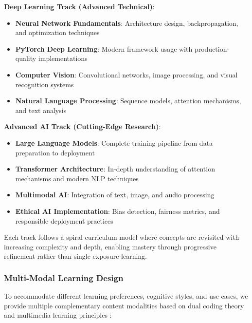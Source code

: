 \textbf{Deep Learning Track (Advanced Technical)}:
\begin{itemize}
    \item \textbf{Neural Network Fundamentals}: Architecture design, backpropagation, and optimization techniques
    \item \textbf{PyTorch Deep Learning}: Modern framework usage with production-quality implementations
    \item \textbf{Computer Vision}: Convolutional networks, image processing, and visual recognition systems
    \item \textbf{Natural Language Processing}: Sequence models, attention mechanisms, and text analysis
\end{itemize}

\textbf{Advanced AI Track (Cutting-Edge Research)}:
\begin{itemize}
    \item \textbf{Large Language Models}: Complete training pipeline from data preparation to deployment
    \item \textbf{Transformer Architecture}: In-depth understanding of attention mechanisms and modern NLP techniques
    \item \textbf{Multimodal AI}: Integration of text, image, and audio processing
    \item \textbf{Ethical AI Implementation}: Bias detection, fairness metrics, and responsible deployment practices
\end{itemize}

Each track follows a spiral curriculum model \cite{bruner1960process} where concepts are revisited with increasing complexity and depth, enabling mastery through progressive refinement rather than single-exposure learning.

\subsubsection{Multi-Modal Learning Design}

To accommodate different learning preferences, cognitive styles, and use cases, we provide multiple complementary content modalities based on dual coding theory \cite{paivio1986mental} and multimedia learning principles \cite{mayer2005cambridge}:

